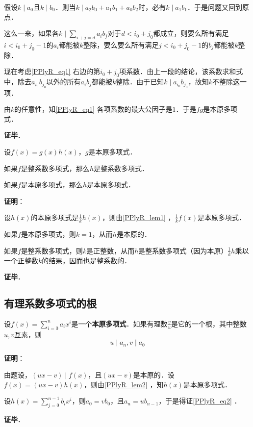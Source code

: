 假设$k\mid a_0$且$k\mid b_0$．则当$k\mid a_2b_0+a_1b_1+a_0b_2$时，必有$k\mid a_1b_1$．于是问题又回到原点．

这么一来，如果各$k\mid\sum_{i+j=d}a_ib_j$对于$d<i_0+j_0$都成立，则要么所有满足$i<i_0+j_0-1$的$a_i$都能被$k$整除，要么要么所有满足$j<i_0+j_0-1$的$b_j$都能被$k$整除．

现在考虑\autoref{PPlyR_eq1} 右边的第$i_0+j_0$项系数．由上一段的结论，该系数求和式中，除去$a_{i_0}b_{j_0}$以外的所有$a_ib_j$都能被$k$整除．由于已知$k\mid a_{i_0}b_{j_0}$，故知$k$不整除这一项．

由$k$的任意性，知\autoref{PPlyR_eq1} 各项系数的最大公因子是$1$．于是$fg$是本原多项式．



\textbf{证毕}．



\begin{lemma}{}\label{PPlyR_lem2}
设$f(x)=g(x)h(x)$，$g$是本原多项式．

如果$f$是整系数多项式，那么$h$是整系数多项式．

如果$f$是本原多项式，那么$h$是本原多项式．
\end{lemma}

\textbf{证明}：

设$h(x)$的本原多项式是$\frac{1}{k}h(x)$，则由\autoref{PPlyR_lem1} ，$\frac{1}{k}f(x)$是本原多项式．

如果$f$是本原多项式，则$k=1$，从而$h$是本原的．

如果$f$是整系数多项式，则$k$是正整数，从而$h$是整系数多项式（因为本原）$\frac{1}{k}h$乘以一个正整数$k$的结果，因而也是整系数的．



\textbf{证毕}．




\subsection{有理系数多项式的根}

\begin{theorem}{}
设$f(x)=\sum_{i=0}^n a_ix^i$是一个\textbf{本原多项式}．如果有理数$\frac{v}{u}$是它的一个根，其中整数$u, v$互素，则
\begin{equation}\label{PPlyR_eq2}
u\mid a_n, v\mid a_0
\end{equation}
\end{theorem}

\textbf{证明}：

由题设，$(ux-v)\mid f(x)$，且$(ux-v)$是本原的．设$f(x)=(ux-v)h(x)$，则由\autoref{PPlyR_lem2} ，知$h(x)$是本原多项式．

设$h(x)=\sum_{j=0}^{n-1} b_ix^i$，则$a_0=vb_0$，且$a_n=ub_{n-1}$，于是得证\autoref{PPlyR_eq2} ．

\textbf{证毕}．














